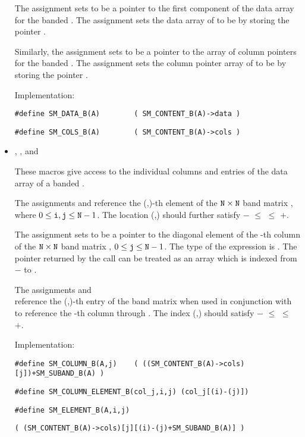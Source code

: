 \begin{itemize}
  The assignment  sets  to be
  a pointer to the first component of the data array for the
  banded  .  The assignment  sets the data array of  to be  by storing
  the pointer .

  Similarly, the assignment  sets  to be
  a pointer to the array of column pointers for the banded  .
  The assignment  sets the column pointer
  array of  to be  by storing the pointer .

  Implementation:

  \verb|#define SM_DATA_B(A)        ( SM_CONTENT_B(A)->data )|

  \verb|#define SM_COLS_B(A)        ( SM_CONTENT_B(A)->cols )|


\item {}, , and 

  These macros give access to the individual columns and entries of
  the data array of a banded .

  The assignments  and  reference the (,)-th element of the
  ${\tt N} \times {\tt N}$ band matrix , where $0 \le {\tt i}, {\tt j} \le {\tt N}-1$.
  The location (,) should further satisfy
  $-$ $\le$  $\le$ $+$.

  The assignment  sets  to be
  a pointer to the diagonal element of the -th column of the
  ${\tt N} \times {\tt N}$ band matrix , $0 \le {\tt j} \le {\tt N}-1$.
  The type of the expression  is .
  The pointer returned by the call  can be treated as
  an array which is indexed from $-$ to .

  The assignments  and\\
   reference the
  (,)-th entry of the band matrix  when used in
  conjunction with  to reference the -th column
  through . The index (,) should satisfy
  $-$ $\le$  $\le$ $+$.

  Implementation:

  \verb|#define SM_COLUMN_B(A,j)    ( ((SM_CONTENT_B(A)->cols)[j])+SM_SUBAND_B(A) )|

  \verb|#define SM_COLUMN_ELEMENT_B(col_j,i,j) (col_j[(i)-(j)])|

  \verb|#define SM_ELEMENT_B(A,i,j)|

  \hspace{1in} \verb|( (SM_CONTENT_B(A)->cols)[j][(i)-(j)+SM_SUBAND_B(A)] )|

\end{itemize}



